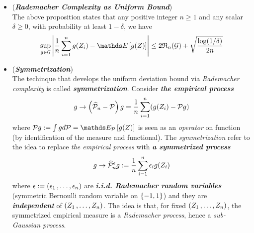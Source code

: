 \documentclass[11pt]{article}
\begin{document}
\begin{itemize}
\begin{proof}
\begin{enumerate}
\item Bound \emph{the probability} of \emph{tail events} for \emph{empircal Rademacher complexity}:
\begin{align*}
\frR_{n}(\cG)  - \widehat{\mathfrak{R}}_{n}(\cG)
\end{align*} In this part, we use \emph{the bounded difference inequality} again, noticing that \emph{the empirical Rademacher complexity} is function with bounded difference $1/n$. Therefore, 
\begin{align}
\frR_{n}(\cG)  &\le \widehat{\mathfrak{R}}_{n}(\cG) + \sqrt{\frac{\log(2/\delta)}{2n}} \label{pf: rad_comp_bound_3}
\end{align}
Finally, we combines the inequalities in \eqref{eqn: Rademacher_bound_1} and \eqref{pf: rad_comp_bound_3} using union bounds to obtain the final result. \qed
\end{enumerate}
\end{proof} 

\item \begin{remark}(\textbf{\emph{Rademacher Complexity as Uniform Bound}}) \\
The above proposition states that any positive integer $n \ge 1$ and any scalar $\delta \ge 0$, with probability at least $1 - \delta$, we have
\begin{align*}
\sup_{g \in \cG}\abs{\frac{1}{n}\sum_{i=1}^{n}g(Z_i)  - \E{}{g(Z)}} \le 2 \frR_{n}(\cG)  + \sqrt{\frac{\log(1 / \delta)}{2n}}
\end{align*}
\end{remark}

\item \begin{remark}(\textbf{\emph{Symmetrization}}) \\
The techinque that develops the uniform deviation bound via \emph{Rademacher complexity} is called \emph{\textbf{symmetrization}}. Consider \emph{\textbf{the empirical process}}
\begin{align*}
g \to \left(\widehat{{\mathcal P}}_n - {\mathcal P}\right)g = \frac{1}{n}\sum_{i=1}^{n}(g(Z_i)  - {\mathcal P} g)
\end{align*} where $\cP g := \int g d\cP = \E{\cP}{g(Z)}$ is seen as an \emph{operator} on function (by identification of the measure and functional). The \emph{symmetrization} refer to the idea to replace \emph{the empirical process} with \emph{\textbf{a symmetrized process}}
\begin{align*}
g \to \widehat{{\mathcal P}}_n^{\epsilon}g := \frac{1}{n}\sum_{i=1}^{n}\epsilon_i g(Z_i)
\end{align*} where $\epsilon := (\epsilon_1 \,{,}\ldots{,}\, \epsilon_n)$ are \emph{\textbf{i.i.d. Rademacher random variables}} (symmetric Bernoulli random variable on $\left\{-1, 1\right\}$) and they are  \emph{\textbf{independent}} of $(Z_1 \,{,}\ldots{,}\, Z_n)$. The idea is that, for fixed $(Z_1 \,{,}\ldots{,}\, Z_n)$, the symmetrized empirical measure is a \emph{Rademacher process}, hence a \emph{sub-Gaussian process}.


\end{remark}
\end{itemize}
\end{document}
